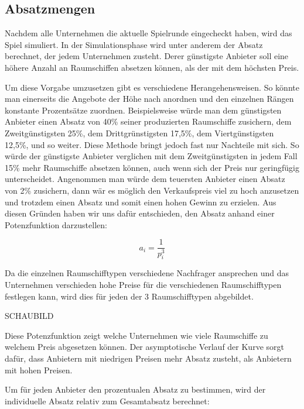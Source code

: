 \subsection{Absatzmengen}
\label{sub:spielwelt-logik-absatzmengen}

Nachdem alle Unternehmen die aktuelle Spielrunde eingecheckt haben, wird das Spiel simuliert. In der Simulationsphase
wird unter anderem der Absatz berechnet, der jedem Unternehmen zusteht. Derer günstigste Anbieter soll eine höhere
Anzahl an Raumschiffen absetzen können, als der mit dem höchsten Preis.

Um diese Vorgabe umzusetzen gibt es verschiedene Herangehensweisen. So könnte man einerseits die Angebote der Höhe nach
anordnen und den einzelnen Rängen konstante Prozentsätze zuordnen. Beispielsweise würde man dem günstigsten Anbieter
einen Absatz von 40\% seiner produzierten Raumschiffe zusichern, dem Zweitgünstigsten 25\%, dem Drittgrünstigsten 17,5\%,
dem Viertgünstigsten 12,5\%, und so weiter. Diese Methode bringt jedoch fast nur Nachteile mit sich. So würde der günstigste
Anbieter verglichen mit dem Zweitgünstigsten in jedem Fall 15\% mehr Raumschiffe absetzen können, auch wenn sich der Preis
nur geringfügig unterscheidet. Angenommen man würde dem teuersten Anbieter einen Absatz von 2\% zusichern, dann wär es möglich
den Verkaufspreis viel zu hoch anzusetzen und trotzdem einen Absatz und somit einen hohen Gewinn zu erzielen. Aus diesen
Gründen haben wir uns dafür entschieden, den Absatz anhand einer Potenzfunktion darzustellen:

\begin{equation}
     a_i = \frac{1}{p_i^3}
     \label{alg:spielwelt-logik-absatzmengen-1}
\end{equation}

Da die einzelnen Raumschifftypen verschiedene Nachfrager ansprechen und das Unternehmen verschieden hohe Preise für die
verschiedenen Raumschifftypen festlegen kann, wird dies für jeden der 3 Raumschifftypen abgebildet.

SCHAUBILD

Diese Potenzfunktion zeigt welche Unternehmen wie viele Raumschiffe zu welchem Preis abgesetzen können. Der asymptotische
Verlauf der Kurve sorgt dafür, dass Anbietern mit niedrigen Preisen mehr Absatz zusteht, als Anbietern mit hohen Preisen.

Um für jeden Anbieter den prozentualen Absatz zu bestimmen, wird der individuelle Absatz relativ zum Gesamtabsatz berechnet:

